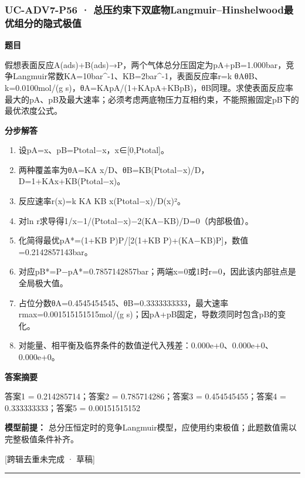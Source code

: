 \documentclass[UTF8,11pt,a4paper]{ctexart}
\begin{document}
\subsubsection*{UC-ADV7-P56 · 总压约束下双底物Langmuir–Hinshelwood最优组分的隐式极值}
\noindent\textbf{题目}\par
假想表面反应A(ads)+B(ads)→P，两个气体总分压固定为pA+pB=1.000bar，竞争Langmuir常数KA=10bar\textasciicircum{}-1、KB=2bar\textasciicircum{}-1，表面反应率r=k θAθB、k=0.0100mol/(g s)，θA=KApA/(1+KApA+KBpB)，θB同理。求使表面反应率最大的pA、pB及最大速率；必须考虑两底物压力互相约束，不能照搬固定pB下的最优浓度公式。\par
\medskip\noindent\textbf{分步解答}
\begin{enumerate}
\item 设pA=x、pB=Ptotal−x，x∈[0,Ptotal]。
\item 两种覆盖率为θA=KA x/D、θB=KB(Ptotal−x)/D，D=1+KAx+KB(Ptotal−x)。
\item 反应速率r(x)=k KA KB x(Ptotal−x)/D(x)²。
\item 对ln r求导得1/x−1/(Ptotal−x)−2(KA−KB)/D=0（内部极值）。
\item 化简得最优pA*=(1+KB P)P/[2(1+KB P)+(KA−KB)P]，数值=0.2142857143bar。
\item 对应pB*=P−pA*=0.7857142857bar；两端x=0或1时r=0，因此该内部驻点是全局极大值。
\item 占位分数θA=0.4545454545、θB=0.3333333333，最大速率rmax=0.001515151515mol/(g s)；因pA+pB固定，导数须同时包含pB的变化。
\item 对能量、相平衡及临界条件的数值逆代入残差：0.000e+0、0.000e+0、0.000e+0。
\end{enumerate}
\noindent\textbf{答案摘要}\par
答案1 = 0.214285714；答案2 = 0.785714286；答案3 = 0.454545455；答案4 = 0.333333333；答案5 = 0.00151515152\par
\noindent\textbf{模型前提：}
总分压恒定时的竞争Langmuir模型，应使用约束极值；此题数值需以完整极值条件补齐。\par
\noindent\textcolor{red!65!black}{[跨辑去重未完成 · 草稿]} \par
\medskip\hrule\medskip
{}
\end{document}
